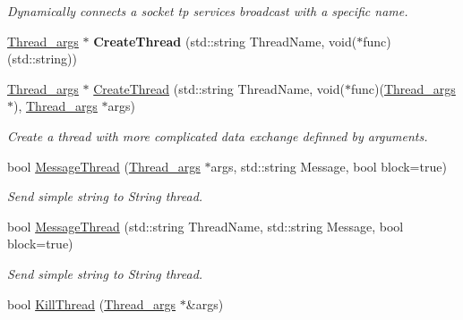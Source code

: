 \begin{DoxyCompactItemize}
\begin{DoxyCompactList}\small\item\em Dynamically connects a socket tp services broadcast with a specific name. \end{DoxyCompactList}\item 
\hypertarget{classUtilities_a09033997a8c4c99ebc588b3c09d45ae6}{\hyperlink{structThread__args}{Thread\-\_\-args} $\ast$ {\bfseries Create\-Thread} (std\-::string Thread\-Name, void($\ast$func)(std\-::string))}\label{classUtilities_a09033997a8c4c99ebc588b3c09d45ae6}

\item 
\hypertarget{classUtilities_ae52d1dd16b34518b2ef4de01660cb8b2}{\hyperlink{structThread__args}{Thread\-\_\-args} $\ast$ \hyperlink{classUtilities_ae52d1dd16b34518b2ef4de01660cb8b2}{Create\-Thread} (std\-::string Thread\-Name, void($\ast$func)(\hyperlink{structThread__args}{Thread\-\_\-args} $\ast$), \hyperlink{structThread__args}{Thread\-\_\-args} $\ast$args)}\label{classUtilities_ae52d1dd16b34518b2ef4de01660cb8b2}

\begin{DoxyCompactList}\small\item\em Create a thread with more complicated data exchange definned by arguments. \end{DoxyCompactList}\item 
\hypertarget{classUtilities_a3e2f8b04a35871f014628761c5e7e121}{bool \hyperlink{classUtilities_a3e2f8b04a35871f014628761c5e7e121}{Message\-Thread} (\hyperlink{structThread__args}{Thread\-\_\-args} $\ast$args, std\-::string Message, bool block=true)}\label{classUtilities_a3e2f8b04a35871f014628761c5e7e121}

\begin{DoxyCompactList}\small\item\em Send simple string to String thread. \end{DoxyCompactList}\item 
\hypertarget{classUtilities_a9aee7ba7f0e34b73b363133c8af74f92}{bool \hyperlink{classUtilities_a9aee7ba7f0e34b73b363133c8af74f92}{Message\-Thread} (std\-::string Thread\-Name, std\-::string Message, bool block=true)}\label{classUtilities_a9aee7ba7f0e34b73b363133c8af74f92}

\begin{DoxyCompactList}\small\item\em Send simple string to String thread. \end{DoxyCompactList}\item 
\hypertarget{classUtilities_a6f1c1d53b9ce59bb26c56a3bebdbb255}{bool \hyperlink{classUtilities_a6f1c1d53b9ce59bb26c56a3bebdbb255}{Kill\-Thread} (\hyperlink{structThread__args}{Thread\-\_\-args} $\ast$\&args)}\label{classUtilities_a6f1c1d53b9ce59bb26c56a3bebdbb255}


\end{DoxyCompactItemize}
